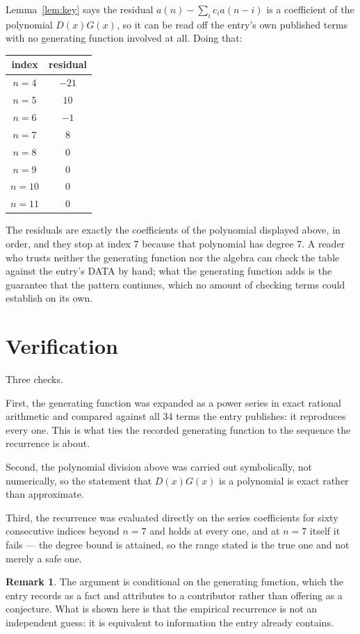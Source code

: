 \documentclass[11pt,a4paper]{article}
\theoremstyle{plain}
\theoremstyle{definition}
\newtheorem{remark}[theorem]{Remark}
\begin{document}
Lemma~\ref{lem:key} says the residual $a(n)-\sum_ic_ia(n-i)$ is a coefficient of the
polynomial $D(x)G(x)$, so it can be read off the entry's own published terms with no
generating function involved at all. Doing that:
\begin{center}
\begin{tabular}{cc}
index & residual \\ \hline
$n=4$ & $-21$ \\
$n=5$ & $10$ \\
$n=6$ & $-1$ \\
$n=7$ & $8$ \\
$n=8$ & $0$ \\
$n=9$ & $0$ \\
$n=10$ & $0$ \\
$n=11$ & $0$
\end{tabular}
\end{center}
The residuals are exactly the coefficients of the polynomial displayed above, in order, and
they stop at index $7$ because that polynomial has degree $7$. A reader who trusts
neither the generating function nor the algebra can check the table against the entry's DATA
by hand; what the generating function adds is the guarantee that the pattern continues, which
no amount of checking terms could establish on its own.

\section{Verification}

Three checks.

First, the generating function was expanded as a power series in exact rational arithmetic and
compared against all $34$ terms the entry publishes: it reproduces every one. This is
what ties the recorded generating function to the sequence the recurrence is about.

Second, the polynomial division above was carried out symbolically, not numerically, so the
statement that $D(x)G(x)$ is a polynomial is exact rather than approximate.

Third, the recurrence was evaluated directly on the series coefficients for sixty consecutive
indices beyond $n=7$ and holds at every one, and at $n=7$ itself it fails --- the
degree bound is attained, so the range stated is the true one and not merely a safe one.

\begin{remark}
The argument is conditional on the generating function, which the entry records as a fact and
attributes to a contributor rather than offering as a conjecture. What is shown here is that
the empirical recurrence is not an independent guess: it is equivalent to information the
entry already contains.
\end{remark}
\end{document}
